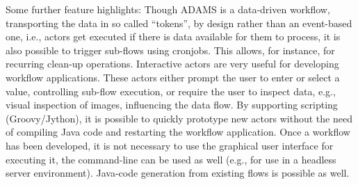 \documentclass[a4paper,10pt]{article}
\begin{document}
Some further feature highlights: Though ADAMS is a data-driven workflow, transporting the data in so called ``tokens'', by design rather than an event-based one, i.e., actors get executed if there is data available for them to process, it is also possible to trigger sub-flows using cronjobs. This allows, for instance, for recurring clean-up operations. Interactive actors are very useful for developing workflow applications. These actors either prompt the user to enter or select a value, controlling sub-flow execution, or require the user to inspect data, e.g., visual inspection of images, influencing the data flow. By supporting scripting (Groovy/Jython), it is possible to quickly prototype new actors without the need of compiling Java code and restarting the workflow application. Once a workflow has been developed, it is not necessary to use the graphical user interface for executing it, the command-line can be used as well (e.g., for use in a headless server environment). Java-code generation from existing 
flows is possible as well.
\end{document}
